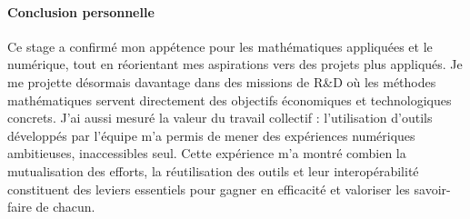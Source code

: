 \paragraph*{Conclusion personnelle}
Ce stage a confirmé mon appétence pour les mathématiques appliquées et le numérique, tout en réorientant mes aspirations vers des projets plus appliqués.
Je me projette désormais davantage dans des missions de R\&D où les méthodes mathématiques servent directement des objectifs économiques et technologiques concrets.
J’ai aussi mesuré la valeur du travail collectif : l’utilisation d’outils développés par l’équipe m’a permis de mener des expériences numériques ambitieuses, inaccessibles seul.
Cette expérience m’a montré combien la mutualisation des efforts, la réutilisation des outils et leur interopérabilité constituent des leviers essentiels pour gagner en efficacité et valoriser les savoir-faire de chacun.
